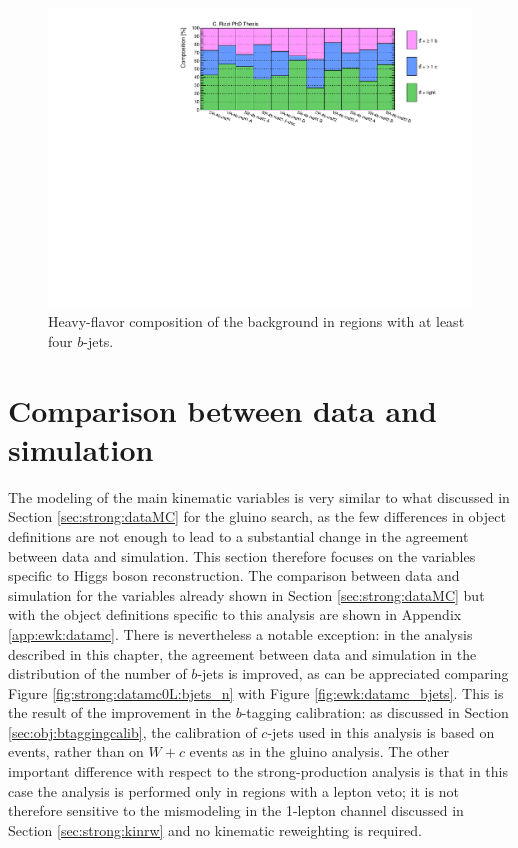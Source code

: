 \begin{figure}[htbp]
\includegraphics[width=\textwidth]{figures/ewk_prod/comp_plots/hh_4b_HF.pdf}
\caption{Heavy-flavor composition of the \ttbar background in regions with at least four $b$-jets.}
	\label{fig:HFcomp_hh4b}
\end{figure}

\FloatBarrier

\section{Comparison between data and simulation}
\label{sec:ewk:dataMC}

The modeling of the main kinematic variables is very similar to what discussed in Section \ref{sec:strong:dataMC} 
for the gluino search, as the few differences in object definitions are not enough to 
lead to a substantial change in the agreement between data and simulation. 
This section therefore focuses on the variables specific to Higgs boson reconstruction.
The comparison between data and simulation for the variables already shown in Section \ref{sec:strong:dataMC} but with the object definitions 
specific to this analysis are shown in Appendix \ref{app:ewk:datamc}.
There is nevertheless a notable exception: in the analysis described in this chapter, the agreement between data and simulation in the 
distribution of the number of $b$-jets is improved, as can be appreciated comparing Figure \ref{fig:strong:datamc0L:bjets_n} with Figure \ref{fig:ewk:datamc_bjets}.
This is the result of the improvement in the $b$-tagging calibration: as discussed in Section \ref{sec:obj:btaggingcalib}, 
the calibration of $c$-jets used in this analysis is based on \ttbar events, rather than on $W+c$ events as in the gluino analysis.
The other important difference with respect to the strong-production analysis is that in this case the analysis is performed 
only in regions with a lepton veto; it is not therefore sensitive to the mismodeling in the 1-lepton channel discussed in Section 
\ref{sec:strong:kinrw} and no kinematic reweighting is required. 

